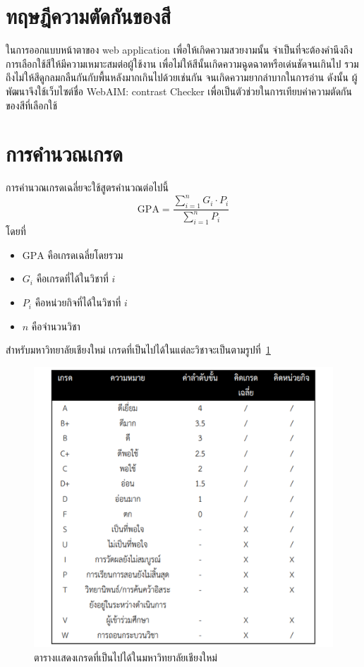 \section{ทฤษฎีความตัดกันของสี}

ในการออกแบบหน้าตาของ web application เพื่อให้เกิดความสวยงามนั้น จำเป็นที่จะต้องคำนึงถึงการเลือกใช้สีให้มีความเหมาะสมต่อผู้ใช้งาน เพื่อไม่ให้สีนั้นเกิดความฉูดฉาดหรือเด่นชัดจนเกินไป รวมถึงไม่ให้สีดูกลมกลืนกันกับพื้นหลังมากเกินไปด้วยเช่นกัน จนเกิดความยากลำบากในการอ่าน ดังนั้น ผู้พัฒนาจึงใช้เว็บไซต์ชื่อ WebAIM: contrast Checker เพื่อเป็นตัวช่วยในการเทียบค่าความตัดกันของสีที่เลือกใช้

\section{การคํานวณเกรด}

การคำนวณเกรดเฉลี่ยจะใช้สูตรคำนวณต่อไปนี้
\[\mathrm{GPA}=\frac{\sum_{i=1}^{n}{G_i\cdot P_i}}{\sum_{i=1}^{n}{P_i}}\]
โดยที่
\begin{itemize}
\item $\mathrm{GPA}$ คือเกรดเฉลี่ยโดยรวม 
\item $G_i$ คือเกรดที่ได้ในวิชาที่ $i$
\item $P_i$ คือหน่วยกิจที่ได้ในวิชาที่ $i$
\item $n$ คือจำนวนวิชา
\end{itemize}
สำหรับมหาวิทยาลัยเชียงใหม่ เกรดที่เป็นไปได้ในแต่ละวิชาจะเป็นตามรูปที่~\ref{fig:cmu-grade-tbl}

\begin{figure}
  \begin{center}
  \includegraphics[width=1\textwidth]{table.png}
  \end{center}
  \caption {ตารางเเสดงเกรดที่เป็นไปได้ในมหาวิทยาลัยเชียงใหม่}
  \label{fig:cmu-grade-tbl}
  \end{figure}

